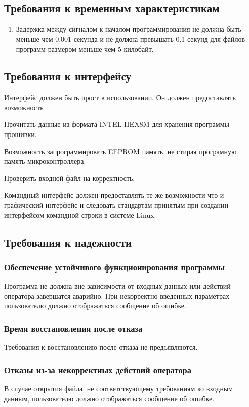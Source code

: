 \subsection{Требования к временным характеристикам}
\begin{enumerate}
\item Задержка между сигналом к началом программирования не должна быть меньше чем 0.001 секунда и не должна превышать 0.1 секунд для файлов программ размером меньше чем 5 килобайт.
\end{enumerate}


\subsection{Требования к интерфейсу}
Интерфейс должен быть прост в использовании. Он должен предоставлять возможность
\begin{my_enumerate}
\item Прочитать данные из формата INTEL HEX8M для хранения программы прошивки.
\item Возможность запрограммировать EEPROM память, не стирая програмную память микроконтроллера.
\item Проверить входной файл на корректность.
\end{my_enumerate}

Командный интерфейс должен предоставлять те же возможности что и графический интерфейс и следовать стандартам принятым при создании интерфейсом командной строки в системе Linux.

\subsection{Требования к надежности}
\subsubsection{Обеспечение устойчивого функционирования программы}
Программа не должна вне зависимости от входных данных или действий оператора завершатся аварийно. При некорректно введенных параметрах пользователю должно отображаться сообщение об ошибке.
\subsubsection{Время восстановления после отказа}
Требования к восстановлению после отказа не предъявляются.
\subsubsection{Отказы из-за некорректных действий оператора}
В случае открытия файла, не соответствующему требованиям ко входным данным, пользователю должно отображаться сообщение об ошибке.
